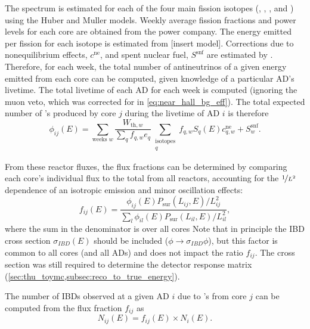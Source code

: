 The \nuebar{} spectrum is estimated for each of the four main fission isotopes
(, , , and )
using the Huber and Muller models.
Weekly average fission fractions and power levels for each core
are obtained from the power company.
The energy emitted per fission for each isotope is estimated from
[insert model].
Corrections due to nonequilibrium effects, $c^{\text{ne}}$,
and spent nuclear fuel, $S^{\text{snf}}$
are estimated by .
Therefore, for each week, the total number of antineutrinos
of a given energy emitted from each core can be computed,
given knowledge of a particular AD's livetime.
The total livetime of each AD for each week is computed
(ignoring the muon veto, which was corrected for in
\cref{eq:near_hall_bg_eff}).
The total expected number of \nuebar{}'s produced by core $j$
during the livetime of AD $i$ is therefore
\begin{equation}
    \phi_{ij}(E) = \sum_{\text{weeks }w}
        \frac{W_{\text{th},w}}{\sum_q f_{q,w} e_q}
        \sum_{\substack{\text{isotopes}\\q}}
        f_{q,w} S_q(E) c_{q,w}^{\text{ne}} + S_w^{\text{snf}}.
\end{equation}

From these reactor fluxes, the flux fractions can be determined
by comparing each core's individual flux to the total from all reactors,
accounting for the $\nicefrac{1}{L^2}$ dependence of an isotropic emission
and minor oscillation effects:
\begin{equation}\label{eq:flux_fraction}
    f_{ij}(E) = \frac{\phi_{ij}(E)P_\text{sur}(L_{ij}, E)/L_{ij}^2}{
        \sum_l \phi_{il}(E)P_\text{sur}(L_{il}, E)/L_{il}^2
    },
\end{equation}
where the sum in the denominator is over all cores
Note that in principle the IBD cross section $\sigma_{IBD}(E)$
should be included ($\phi \to \sigma_{IBD}\phi$),
but this factor is common to all cores (and all ADs)
and does not impact the ratio $f_{ij}$.
The cross section was still required to determine the detector response matrix
(\cref{sec:thu_toymc,subsec:reco_to_true_energy}).

The number of IBDs observed at a given AD $i$ due to \nuebar{}'s from core $j$
can be computed from the flux fraction $f_{ij}$ as
\begin{equation}\label{eq:num_ibds_from_core_ij}
    N_{ij}(E) = f_{ij}(E) \times N_i(E).
\end{equation}

